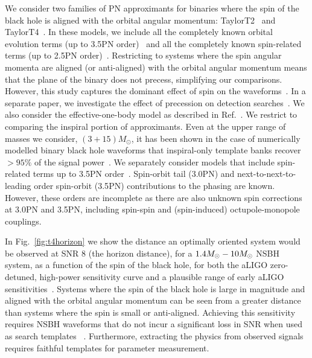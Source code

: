 We consider two families of \ac{PN} approximants for binaries where the spin
of the black hole is aligned with the orbital angular momentum:
TaylorT2~\cite{Blanchet:1996pi, Droz:1999qx, Blanchet:2006zz} and
TaylorT4~\cite{Buonanno:2002fy}.  In these models, we include all the
completely known orbital evolution terms (up to 3.5\ac{PN} order)~\cite{Wiseman:1993aj,Blanchet:1995fg,Blanchet:1995ez,Blanchet:1996pi,
Blanchet:2001ax, Blanchet:2004ek} and all the
completely known spin-related terms (up to 2.5\ac{PN}
order)~\cite{Faye:2006gx, Blanchet:2006gy, Kidder:1992fr, Mikoczi:2005dn,
Racine:2008kj}.  Restricting to systems where the spin angular momenta are
aligned (or anti-aligned) with the orbital angular momentum means that the
plane of the binary does not precess, simplifying our comparisons. However,
this study captures the dominant effect of spin on the
waveforms~\cite{Brown:2012gs}. In a separate paper, we investigate the effect
of precession on detection searches~\cite{Harry:2013effectualness}.
We also consider the
effective-one-body model as described in Ref.~\cite{Taracchini:2012ig}. 
We restrict to comparing the inspiral portion of approximants. Even at the upper 
range of masses we consider, $(3+15)M_{\odot}$, it has been shown in the case of numerically modelled 
binary black hole waveforms that inspiral-only
template banks recover $> 95\%$ of the signal power~\cite{Brown:2012nn, Smith:2013mfa}.
We separately consider models that include
spin-related terms up to 3.5\ac{PN} order~\cite{Bohe:2013cla,
Blanchet:2011zv}. Spin-orbit tail (3.0\ac{PN}) and next-to-next-to-leading
order spin-orbit (3.5\ac{PN}) contributions to the phasing are known.
However, these orders are incomplete as there are also unknown spin
corrections at 3.0\ac{PN} and 3.5\ac{PN}, including spin-spin and
(spin-induced) octupole-monopole couplings. 

In Fig.~\ref{fig:t4horizon} we show  
the distance an optimally oriented system would be observed at \ac{SNR} 8 (the horizon distance),
for a $1.4M_\odot-10M_\odot$ \ac{NSBH} system, as a function of the spin of the
black hole, for both the \ac{aLIGO} zero-detuned, high-power sensitivity curve and a
plausible range of early \ac{aLIGO} sensitivities~\cite{Aasi:2013wya}. 
Systems where the spin of the black hole is large in magnitude and aligned with the orbital 
angular momentum can be seen from a greater distance than systems where the spin is 
small or anti-aligned. Achieving this sensitivity requires \ac{NSBH} waveforms that do not
incur a significant loss in \ac{SNR} when used as search templates ~\cite{Apostolatos:1996rf}.
Furthermore, extracting the physics from observed signals requires faithful templates for parameter measurement.

